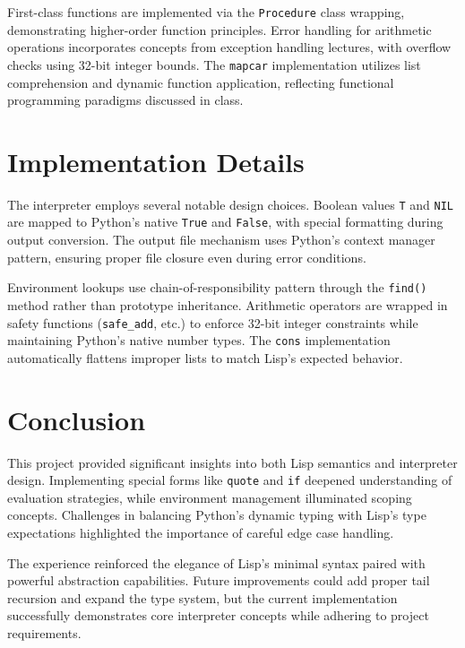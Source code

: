 \documentclass[sigconf]{acmart}
\begin{document}
First-class functions are implemented via the \texttt{Procedure} class wrapping, demonstrating higher-order function principles. Error handling for arithmetic operations incorporates concepts from exception handling lectures, with overflow checks using 32-bit integer bounds. The \texttt{mapcar} implementation utilizes list comprehension and dynamic function application, reflecting functional programming paradigms discussed in class.

\section{Implementation Details}
The interpreter employs several notable design choices. Boolean values \texttt{T} and \texttt{NIL} are mapped to Python's native \texttt{True} and \texttt{False}, with special formatting during output conversion. The output file mechanism uses Python's context manager pattern, ensuring proper file closure even during error conditions.

Environment lookups use chain-of-responsibility pattern through the \texttt{find()} method rather than prototype inheritance. Arithmetic operators are wrapped in safety functions (\texttt{safe\_add}, etc.) to enforce 32-bit integer constraints while maintaining Python's native number types. The \texttt{cons} implementation automatically flattens improper lists to match Lisp's expected behavior.

\section{Conclusion}
This project provided significant insights into both Lisp semantics and interpreter design. Implementing special forms like \texttt{quote} and \texttt{if} deepened understanding of evaluation strategies, while environment management illuminated scoping concepts. Challenges in balancing Python's dynamic typing with Lisp's type expectations highlighted the importance of careful edge case handling.

The experience reinforced the elegance of Lisp's minimal syntax paired with powerful abstraction capabilities. Future improvements could add proper tail recursion and expand the type system, but the current implementation successfully demonstrates core interpreter concepts while adhering to project requirements.



\end{document}
